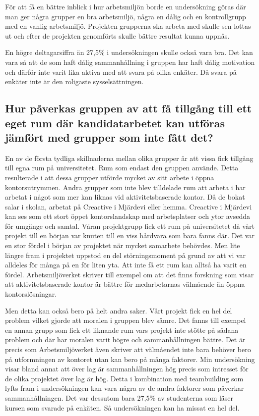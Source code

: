För att få en bättre inblick i hur arbetsmiljön borde en undersökning göras där man ger några grupper en bra arbetsmiljö, några en dålig och en kontrollgrupp med en vanlig arbetsmiljö. Projekten grupperna ska arbeta med skulle sen lottas ut och efter de projekten genomförts skulle bättre resultat kunna uppnås. 

En högre deltagarsiffra än 27,5\% i undersökningen skulle också vara bra. Det kan vara så att de som haft dålig sammanhållning i gruppen har haft dålig motivation och därför inte varit lika aktiva med att svara på olika enkäter. Då svara på enkäter inte är den roligaste sysselsättningen.

\subsection{Hur påverkas gruppen av att få tillgång till ett eget rum där kandidatarbetet kan utföras jämfört med grupper som inte fått det?}
En av de första tydliga skillnaderna mellan olika grupper är att vissa fick tillgång till egna rum på universitetet. Rum som endast den gruppen använde. Detta resulterade i att dessa grupper utförde mycket av sitt arbete i öppna kontorsutrymmen. Andra grupper som inte blev tilldelade rum att arbeta i har arbetat i något som mer kan liknas vid aktivitetsbaserade kontor. Då de bokat salar i skolan, arbetat på Creactive i Mjärdevi eller hemma. Creactive i Mjärdevi kan ses som ett stort öppet kontorslandskap med arbetsplatser och ytor avsedda för umgänge och samtal. Våran projektgrupp fick ett rum på universitetet då vårt projekt till en början var knuten till en viss hårdvara som bara fanns där. Det var en stor fördel i början av projektet när mycket samarbete behövdes. Men lite längre fram i projektet uppstod en del störningsmoment på grund av att vi var alldeles för många på en för liten yta. Att inte få ett rum kan alltså ha varit en fördel. Arbetsmiljöverket skriver till exempel om att det finns forskning som visar att aktivitetsbaserade kontor är bättre för medarbetarnas välmående än öppna kontorslösningar. 

Men detta kan också bero på helt andra saker. Vårt projekt fick en hel del problem vilket gjorde att moralen i gruppen blev sämre. Det fanns till exempel en annan grupp som fick ett liknande rum vars projekt inte stötte på sådana problem och där har moralen varit högre och sammanhållningen bättre. Det är precis som Arbetsmiljöverket även skriver att välmåendet inte bara behöver bero på utformningen av kontoret utan kan bero på många faktorer. Min undersökning visar bland annat att över lag är sammanhållningen hög precis som intresset för de olika projektet över lag är hög. Detta i kombination med teambuilding som lyfts fram i undersökningen kan vara några av de andra faktorer som påverkar sammanhållningen. Det var dessutom bara 27,5\% av studenterna som läser kursen som svarade på enkäten. Så undersökningen kan ha missat en hel del.

